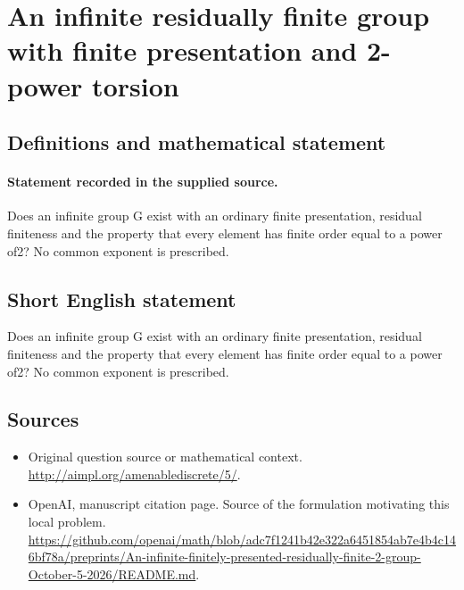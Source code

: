 \documentclass[11pt]{article}
\begin{document}
\section*{An infinite residually finite group with finite presentation and 2-power torsion}\label{30007196}
\subsection{Definitions and mathematical statement}
\paragraph{Statement recorded in the supplied source.}
Does an infinite group G exist with an ordinary finite presentation, residual finiteness and the property that every element has finite order equal to a power of2? No common exponent is prescribed.
\subsection{Short English statement}
Does an infinite group G exist with an ordinary finite presentation, residual finiteness and the property that every element has finite order equal to a power of2? No common exponent is prescribed.
\subsection{Sources}
\begin{itemize}
\item[S1] Original question source or mathematical context.
\url{http://aimpl.org/amenablediscrete/5/}.
\item[S2] OpenAI, manuscript citation page. Source of the formulation motivating this local problem.
\url{https://github.com/openai/math/blob/adc7f1241b42e322a6451854ab7e4b4c146bf78a/preprints/An-infinite-finitely-presented-residually-finite-2-group-October-5-2026/README.md}.
\end{itemize}
\end{document}
